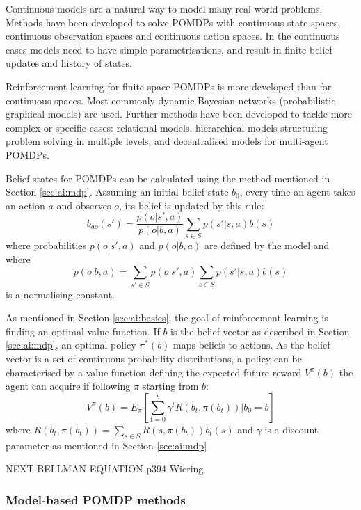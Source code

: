 Continuous models are a natural way to model many real world problems. Methods
have been developed to solve POMDPs with continuous state spaces, continuous
observation spaces and continuous action spaces. In the continuous cases models
need to have simple parametrisations, and result in finite belief updates and
history of states. \parencite{Wiering2012ai+reinforcement}

Reinforcement learning for finite space POMDPs is more developed than for
continuous spaces. Most commonly dynamic Bayesian networks (probabilistic
graphical models) are used. Further methods have been developed to tackle more
complex or specific cases: relational models, hierarchical models structuring
problem solving in multiple levels, and decentralised models for multi-agent
POMDPs. \parencite{Wiering2012ai+reinforcement}

Belief states for POMDPs can be calculated using the method mentioned in
Section \ref{sec:ai:mdp}. Assuming an initial belief state \(b_0\), every time
an agent takes an action \(a\) and observes \(o\), its belief is updated by
this rule: \[ b_{ao}(s') = \frac{ p(o|s',a) }{ p(o|b,a) } \sum_{s \in S}
p(s'|s,a) b(s) \] where probabilities \(p(o|s',a)\) and \(p(o|b,a)\) are
defined by the model and where \[p(o|b,a) = \sum_{s' \in S} p(o|s',a) \sum_{s
\in S} p(s'|s,a) b(s) \] is a normalising constant.
\parencite{Wiering2012ai+reinforcement}

As mentioned in Section \ref{sec:ai:basics}, the goal of reinforcement learning
is finding an optimal value function. If \(b\) is the belief vector as
described in Section \ref{sec:ai:mdp}, an optimal policy \(\pi^*(b)\) maps
beliefs to actions. As the belief vector is a set of continuous probability
distributions, a policy can be characterised by a value function defining the
expected future reward \(V^{\pi}(b)\) the agent can acquire if following
\(\pi\) starting from \(b\): \newline 
\[ V^{\pi}(b) = 
E_{\pi} \left [ \sum_{t=0}^h \gamma^t R(b_t, \pi(b_t)) | b_0 = b \right ] \]
where \( R(b_t, \pi (b_t)) = \sum_{s \in S} R(s, \pi (b_t)) b_t(s) \) and 
\(\gamma\) is a discount parameter as mentioned in Section \ref{sec:ai:mdp}

NEXT BELLMAN EQUATION p394 Wiering



\subsubsection{Model-based POMDP methods}


